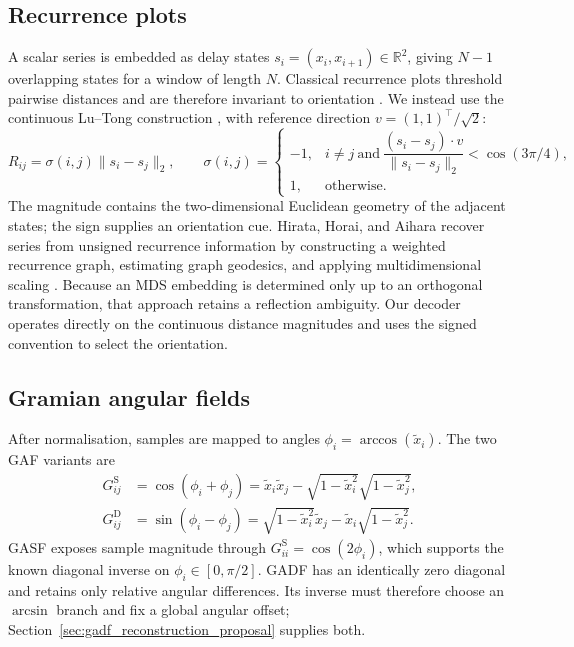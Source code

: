 \documentclass[10pt,a4paper,parskip=half-]{scrartcl}
\begin{document}
\subsection{Recurrence plots}
A scalar series is embedded as delay states \(s_i=(x_i,x_{i+1})\in\mathbb{R}^2\), giving \(N-1\) overlapping states for a window of length \(N\). Classical recurrence plots threshold pairwise distances and are therefore invariant to orientation \cite{takens1981detecting}. We instead use the continuous Lu--Tong construction \cite{lu2019robust}, with reference direction \(v=(1,1)^\top/\sqrt{2}\):
\begin{equation}
R_{ij}=\sigma(i,j)\lVert s_i-s_j\rVert_2,
\qquad
\sigma(i,j)=
\begin{cases}
-1,& i\ne j\ \text{and}\ \dfrac{(s_i-s_j)\cdot v}{\lVert s_i-s_j\rVert_2}<\cos(3\pi/4),\\
1,&\text{otherwise}.
\end{cases}
\label{eq:FormulaRP}
\end{equation}
The magnitude contains the two-dimensional Euclidean geometry of the adjacent states; the sign supplies an orientation cue. Hirata, Horai, and Aihara recover series from unsigned recurrence information by constructing a weighted recurrence graph, estimating graph geodesics, and applying multidimensional scaling \cite{hirata2008reproduction}. Because an MDS embedding is determined only up to an orthogonal transformation, that approach retains a reflection ambiguity. Our decoder operates directly on the continuous distance magnitudes and uses the signed convention to select the orientation.

\subsection{Gramian angular fields}
After normalisation, samples are mapped to angles \(\phi_i=\arccos(\tilde{x}_i)\). The two GAF variants are
\begin{align}
G^{\mathrm{S}}_{ij}
 &=\cos(\phi_i+\phi_j)
 =\tilde{x}_i\tilde{x}_j-\sqrt{1-\tilde{x}_i^2}\sqrt{1-\tilde{x}_j^2},
 \label{eq:gasf_indexed}\\
G^{\mathrm{D}}_{ij}
 &=\sin(\phi_i-\phi_j)
 =\sqrt{1-\tilde{x}_i^2}\tilde{x}_j-\tilde{x}_i\sqrt{1-\tilde{x}_j^2}.
 \label{eq:gadf_indexed}
\end{align}
GASF exposes sample magnitude through \(G^{\mathrm{S}}_{ii}=\cos(2\phi_i)\), which supports the known diagonal inverse on \(\phi_i\in[0,\pi/2]\). GADF has an identically zero diagonal and retains only relative angular differences. Its inverse must therefore choose an \(\arcsin\) branch and fix a global angular offset; Section~\ref{sec:gadf_reconstruction_proposal} supplies both.
\end{document}
